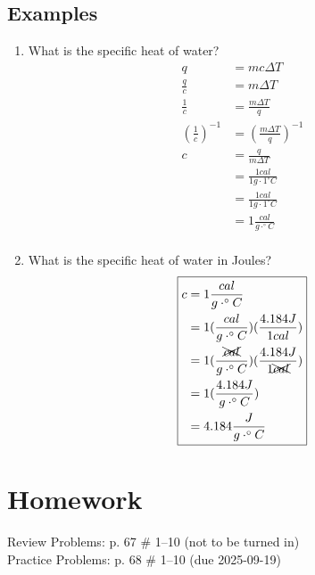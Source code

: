 \documentclass[11pt, oneside]{article}   	%
\begin{document}
\subsection{Examples}
\begin{enumerate}[label=Example \arabic*]
\item What is the specific heat of water?
\begin{equation} 
\boxed{
\begin{split}
    q &= m c \Delta T  \\
    \frac{q}{c} &= m \Delta T \\
    \frac{1}{c} &= \frac{m \Delta T}{q} \\
    (\frac{1}{c}) ^{-1} &= (\frac{m \Delta T}{q})^{-1} \\
    c &= \frac{q}{m \Delta T} \\    
       &= \frac{1 cal} {1g \cdot 1^{\circ} C} \\
       &= \frac{1 cal} {1g \cdot 1^{\circ} C} \\
       &= 1 \frac{cal} {g \cdot ^{\circ} C} \\
 \end{split}
 }
 \end{equation}
 \item What is the specific heat of water in Joules?
\begin{equation} 
\boxed{
\begin{split}
      c &= 1 \frac{cal} {g \cdot ^{\circ} C} \\
         &= 1 (\frac{cal} {g \cdot ^{\circ} C})(\frac{4.184 J}{1 cal})\\
         &= 1 (\frac{\xcancel{cal}} {g \cdot ^{\circ} C})(\frac{4.184 J}{1 \xcancel{cal}})\\
         &= 1 (\frac{4.184 J} {g \cdot ^{\circ} C})\\ 
         &= 4.184 \frac{ J} {g \cdot ^{\circ} C}\\     
 \end{split}
 }
 \end{equation}

 \end{enumerate}

\pagebreak

\section{Homework}
Review Problems: p. 67 \# 1--10 (not to be turned in)\\
Practice Problems: p. 68 \# 1--10 (due 2025-09-19)\\


\nocite{wile-chem-2}
{}

\end{document}
